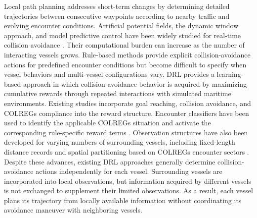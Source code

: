 \documentclass[final,5p,times,twocolumn]{elsarticle}
\begin{document}
{Local path planning addresses short-term changes by determining detailed trajectories between consecutive waypoints according to nearby traffic and evolving encounter conditions. Artificial potential fields, the dynamic window approach, and model predictive control have been widely studied for real-time collision avoidance \citep{58,Xue2024}. Their computational burden can increase as the number of interacting vessels grows. Rule-based methods provide explicit collision-avoidance actions for predefined encounter conditions but become difficult to specify when vessel behaviors and multi-vessel configurations vary. DRL provides a learning-based approach in which collision-avoidance behavior is acquired by maximizing cumulative rewards through repeated interactions with simulated maritime environments. Existing studies incorporate goal reaching, collision avoidance, and COLREGs compliance into the reward structure. Encounter classifiers have been used to identify the applicable COLREGs situation and activate the corresponding rule-specific reward terms \citep{Zhao-COLREGs}. Observation structures have also been developed for varying numbers of surrounding vessels, including fixed-length distance records and spatial partitioning based on COLREGs encounter sectors \citep{122,Zhao-COLREGs}. Despite these advances, existing DRL approaches generally determine collision-avoidance actions independently for each vessel. Surrounding vessels are incorporated into local observations, but information acquired by different vessels is not exchanged to supplement their limited observations. As a result, each vessel plans its trajectory from locally available information without coordinating its avoidance maneuver with neighboring vessels.
}

\end{document}
